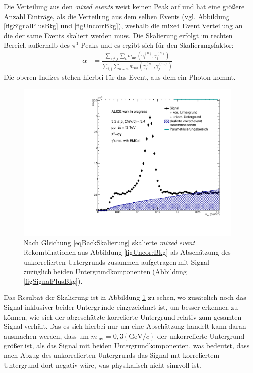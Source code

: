 \documentclass[11pt]{article}
\begin{document}
	Die Verteilung aus den {\it mixed events} weist keinen Peak auf und hat eine gr{\"o}{\ss}ere Anzahl Eintr{\"a}ge, als die Verteilung aus dem selben Events (vgl. Abbildung \ref{figSignalPlusBkg} und \ref{figUncorrBkg}), weshalb die mixed Event Verteilung an die der same Events skaliert werden muss. Die Skalierung erfolgt im rechten Bereich au{\ss}erhalb des $\pi^{0}$-Peaks und es ergibt sich f{\"u}r den Skalierungsfaktor:
	\begin{align}
	\label{eqBackSkalierung}
	\alpha &= \frac{\sum_{i \neq j}\sum_{n}m_{\text{inv}}\left( \gamma^{(n)}_{i},\gamma^{(n)}_{j}\right) }{\sum_{i,j}\sum_{n \neq m}m_{\text{inv}}\left( \gamma^{(n)}_{i},\gamma^{(m)}_{j}\right) }
	\end{align}
	Die oberen Indizes stehen hierbei f{\"u}r das Event, aus dem ein Photon kommt.\newline
	\begin{figure}[tbp]
		\centering
		\includegraphics[width=.7\linewidth]{hUncorrBkgNorm.pdf}
		\caption{Nach Gleichung \ref{eqBackSkalierung} skalierte {\it mixed event} Rekombinationen aus Abbildung \ref{figUncorrBkg} als Absch{\"a}tzung des unkorrelierten Untergrunds zusammen aufgetragen mit Signal zuz{\"u}glich beiden Untergrundkomponenten (Abbildung \ref{figSignalPlusBkg}).}
		\label{figUncorrBkgNorm}
	\end{figure}
	Das Resultat der Skalierung ist in Abbildung \ref{figUncorrBkgNorm} zu sehen, wo zus{\"a}tzlich noch das Signal inklusiver beider Untergr{\"u}nde eingezeichnet ist, um besser erkennen zu k{\"o}nnen, wie sich der abgesch{\"a}tzte korrelierte Untergrund relativ zum gesamten Signal verh{\"a}lt.
	Das es sich hierbei nur um eine Absch{\"a}tzung handelt kann daran ausmachen werden, dass um $m_{\text{inv}} = 0,3 (\text{GeV/}c)$ der unkorrelierte Untergrund gr{\"o}{\ss}er ist, als das Signal mit beiden Untergrundkomponenten, was bedeutet, dass nach Abzug des unkorrelierten Untergrunds das Signal mit korreliertem Untergrund dort negativ w{\"a}re, was physikalisch nicht sinnvoll ist.
\end{document}
